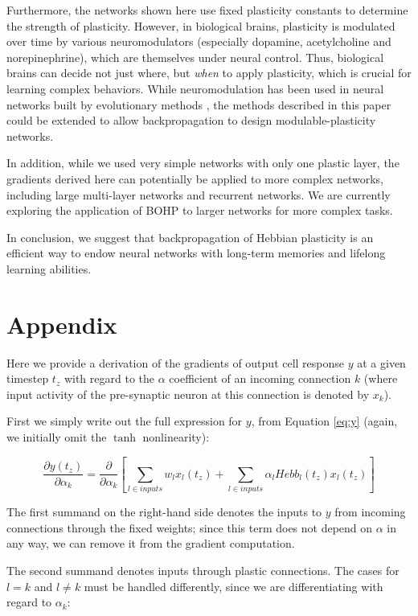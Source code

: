 \documentclass{article}
\begin{document}
Furthermore, the networks shown here use fixed plasticity constants to determine
the strength of plasticity. However, in biological brains, plasticity is
modulated over time by various neuromodulators (especially dopamine,
acetylcholine and norepinephrine), which are themselves under neural control.
Thus, biological brains can decide not just where, but \emph{when} to apply
plasticity, which is crucial for learning complex behaviors. While
neuromodulation has been used in neural networks built by evolutionary methods
\cite{Soltoggio2013-rg}, the methods described in this paper could be extended to allow
backpropagation to design modulable-plasticity networks.

In addition, while we used very simple networks with only one plastic layer, the gradients
derived here can potentially be applied to more complex networks, including large
multi-layer networks and recurrent networks. 
We are currently exploring the application of BOHP to larger networks for more complex tasks.

In conclusion, we suggest that backpropagation of Hebbian plasticity is an
efficient way to endow neural networks with long-term memories and lifelong
learning abilities. 

\section*{Appendix}

Here we provide a derivation of the gradients of output cell
response $y$ at a given timestep $t_z$ with regard to the $\alpha$ coefficient
of an incoming connection $k$ (where input activity of the pre-synaptic neuron
at this connection is denoted by $x_k$). 

First we simply write out the
full expression for $y$, from Equation \ref{eq:y} (again, we initially omit
the $\tanh$ nonlinearity):

\[
\frac{\partial y(t_z)}{\partial \alpha_k} = \frac{\partial }{\partial \alpha_k}[ \sum_{l \in inputs}w_l x_l(t_z) + \sum_{l \in inputs}\alpha_l Hebb_l(t_z) x_l(t_z) ] 
\]

The first summand on the right-hand side denotes the inputs to $y$ from incoming connections through the fixed weights; since this term does not depend on $\alpha$ in any way, we can remove it from the gradient computation.

The second summand denotes inputs through plastic connections. The cases for
$l=k$ and $l\neq k$ must be handled differently, since we are differentiating
with regard to $\alpha_k$:
\end{document}
